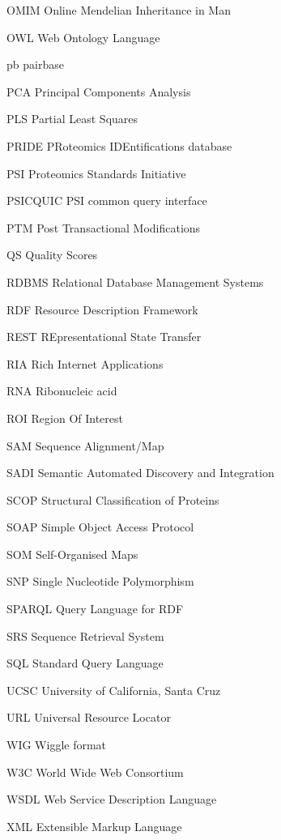 \begin{abbreviations}
	\item[OMIM] Online Mendelian Inheritance in Man
	\item[OWL] Web Ontology Language
	\item[pb] pairbase
	\item[PCA] Principal Components Analysis
	\item[PLS] Partial Least Squares
	\item[PRIDE] PRoteomics IDEntifications database
	\item[PSI] Proteomics Standards Initiative
	\item[PSICQUIC] PSI common query interface
	\item[PTM] Post Transactional Modifications
	\item[QS] Quality Scores
	\item[RDBMS] Relational Database Management Systems
	\item[RDF] Resource Description Framework
	\item[REST] REpresentational State Transfer
	\item[RIA] Rich Internet Applications
	\item[RNA] Ribonucleic acid
	\item[ROI] Region Of Interest
	\item[SAM] Sequence Alignment/Map 
	\item[SADI] Semantic Automated Discovery and Integration
	\item[SCOP] Structural Classification of Proteins
	\item[SOAP] Simple Object Access Protocol
	\item[SOM] Self-Organised Maps 
	\item[SNP] Single Nucleotide Polymorphism
	\item[SPARQL] Query Language for RDF
	\item[SRS] Sequence Retrieval System
	\item[SQL] Standard Query Language
	\item[UCSC] University of California, Santa Cruz
	\item[URL] Universal Resource Locator
	\item[WIG] Wiggle format
	\item[W3C] World Wide Web Consortium
	\item[WSDL] Web Service Description Language
	\item[XML] Extensible Markup Language
\end{abbreviations}

